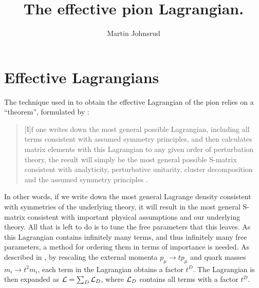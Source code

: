 \documentclass{article}
\title{The effective pion Lagrangian.}
\author{Martin Johnsrud}
\begin{document}
\maketitle 

\section{Effective Lagrangians}

The technique used in \chpt to obtain the effective Lagrangian of the pion relies on a ``theorem'', formulated by \citeauthor{WeinbergPhenom}:
\begin{quote}
    [I]f one writes down the most general possible Lagrangian, including all terms consistent with assumed symmetry principles, and then calculates matrix elements with this Lagrangian to any given order of perturbation theory, the result will simply be the most general possible S-matrix consistent with analyticity, perturbative unitarity, cluster decomposition and the assumed symmetry principles \cite{WeinbergPhenom}.
\end{quote}
In other words, if we write down the most general Lagrange density consistent with symmetries of the underlying theory, it will result in the most general S-matrix consistent with important physical assumptions and our underlying theory.
All that is left to do is to tune the free parameters that this leaves.
As this Lagrangian contains infinitely many terms, and thus infinitely many free parameters, a method for ordering them in terms of importance is needed.
As described in \cite{Scherer2002IntroductionTC}, by rescaling the external momenta $p_\mu \rightarrow t p_\mu$ and quark masses $m_i \rightarrow t^2 m_i$, each term in the Lagrangian obtains a factor $t^D$.
The Lagrangian is then expanded as $\mathcal{L} = \sum_D \mathcal{L}_D$, where $\mathcal{L}_D$ contains all terms with a factor $t^D$.
\end{document}

